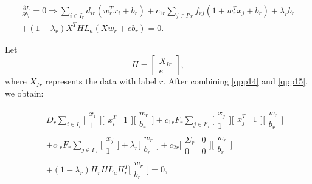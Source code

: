\documentclass[12pt,a4paper,oneside,english]{report}
\begin{document}
\begin{eqnarray}
\frac{\partial L}{\partial b_r} =0  \Rightarrow \sum_{i \in I_r} d_{ir}\left({w}^T_{r}x_i + b_r\right) + c_{1r}\sum_{j\in I'r}f_{rj}\left(1 + w_r^Tx_j +b_r\right) + \lambda_{r}b_r \\ \nonumber + \left(1-\lambda_{r}\right)X^THL_a\left(Xw_r + eb_r\right)=0. \label{qpp15}
\end{eqnarray}
 
 
Let 
\[
H = \begin{bmatrix} 
X_{Ir} \\ 
e 
\end{bmatrix},
\]
where \( X_{Ir} \) represents the data with label \( r \). After combining \eqref{qpp14} and \eqref{qpp15}, we obtain:

\begin{eqnarray*}
&& D_r \sum_{i \in I_r}
\Bigg[\begin{array}{c}
x_i \\ 1
\end{array}\Bigg]
\Bigg[\begin{array}{cc}
x_i^T & 1
\end{array}\Bigg]
\Bigg[\begin{array}{c}
w_r \\ b_r
\end{array}\Bigg] 
+ c_{1r}F_r \sum_{j \in I'_r}
\Bigg[\begin{array}{c}
x_j \\ 1
\end{array}\Bigg]
\Bigg[\begin{array}{cc}
x_j^T & 1
\end{array}\Bigg]
\Bigg[\begin{array}{c}
w_r \\ b_r
\end{array}\Bigg] \\
&& + c_{1r}F_r \sum_{j \in I'_r}
\Bigg[\begin{array}{c}
x_j \\ 1
\end{array}\Bigg] 
+ \lambda_r
\Bigg[\begin{array}{c}
w_r \\ b_r
\end{array}\Bigg] 
+ c_{2r}
\Bigg[\begin{array}{cc}
\Sigma_{r} & 0 \\ 
0 & 0
\end{array}\Bigg]
\Bigg[\begin{array}{c}
w_r \\ b_r
\end{array}\Bigg] \\
&& + (1 - \lambda_r)H_r HL_aH_r^T
\Bigg[\begin{array}{c}
w_r \\ b_r
\end{array}\Bigg] = 0, \label{qpp16}
\end{eqnarray*}
\end{document}
